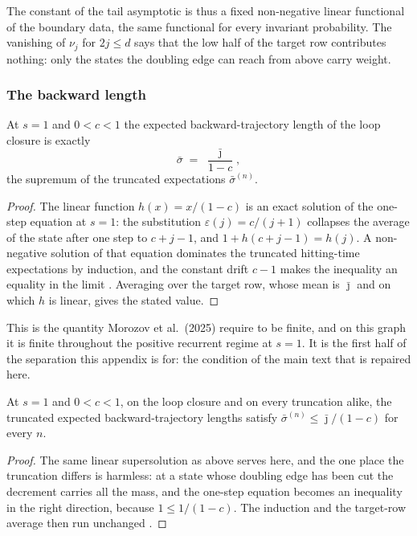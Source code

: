 \noindent The constant of the tail asymptotic is thus a fixed non-negative linear functional of the
boundary data, the same functional for every invariant probability. The vanishing of $\nu_j$
for $2j\leq d$ says that the low half of the target row contributes nothing: only the states
the doubling edge can reach from above carry weight.


\subsubsection{The backward length}


\begin{theorem}
  \label{thm:main_sigmaBar_eq}
  \leanok
At $s=1$ and $0<c<1$ the expected backward-trajectory length of the loop closure is exactly
\[ \bar\sigma \;=\; \frac{\bar\jmath}{1-c}, \]
the supremum of the truncated expectations $\bar\sigma^{(n)}$.
\end{theorem}

\begin{proof}
  \leanok
The linear function $h(x)=x/(1-c)$ is an exact solution of the one-step equation at $s=1$: the
substitution $\varepsilon(j)=c/(j+1)$ collapses the average of the state after one step to
$c+j-1$, and $1+h(c+j-1)=h(j)$. A non-negative solution of that equation dominates the
truncated hitting-time expectations by induction, and the constant drift $c-1$ makes the
inequality an equality in the limit . Averaging over the
target row, whose mean is $\bar\jmath$ and on which $h$ is linear, gives the stated value.
\end{proof}

\noindent This is the quantity Morozov et al.\ (2025) require to be finite, and on this graph it is
finite throughout the positive recurrent regime at $s=1$. It is the first half of the
separation this appendix is for: the condition of the main text that is repaired here.


\begin{theorem}
  \label{thm:main_sigmaBar_le}
  \leanok
At $s=1$ and $0<c<1$, on the loop closure and on every truncation alike, the truncated expected
backward-trajectory lengths satisfy $\bar\sigma^{(n)}\leq\bar\jmath/(1-c)$ for every $n$.
\end{theorem}

\begin{proof}
  \leanok
The same linear supersolution as above serves here, and the one place the truncation differs is
harmless: at a state whose doubling edge has been cut the decrement carries all the mass, and
the one-step equation becomes an inequality in the right direction, because $1\leq1/(1-c)$. The
induction and the target-row average then run unchanged .
\end{proof}

